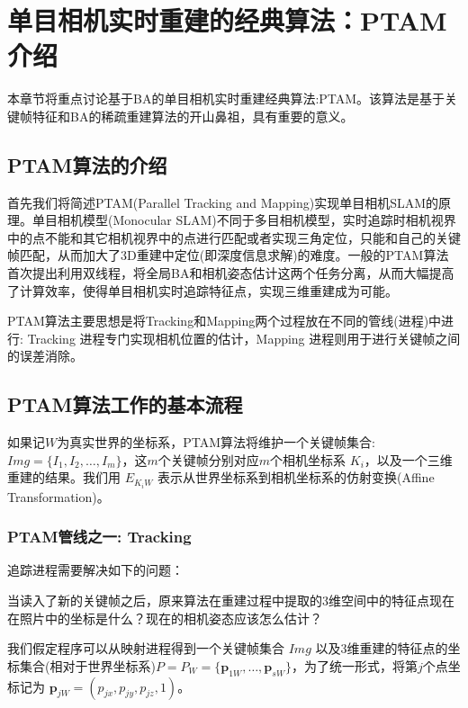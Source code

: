 
\def \R2{\mathbb{R}^2}
\def \R3{\mathbb{R}^3}
\def \Rn{\mathbb{R}^n}

\def \itW{\mathit{W}}

\def \itK{\mathit{K}}
\def \bfp{\mathbf{p}}

\chapter{单目相机实时重建的经典算法：PTAM介绍}

本章节将重点讨论基于BA的单目相机实时重建经典算法:PTAM。该算法是基于关键帧特征和BA的稀疏重建算法的开山鼻祖，具有重要的意义。

\section{PTAM算法的介绍}
首先我们将简述PTAM\cite{Klein2007}(Parallel Tracking and Mapping)实现单目相机SLAM的原理。单目相机模型(Monocular SLAM)不同于多目相机模型，实时追踪时相机视界中的点不能和其它相机视界中的点进行匹配或者实现三角定位，只能和自己的关键帧匹配，从而加大了3D重建中定位(即深度信息求解)的难度。一般的PTAM算法首次提出利用双线程，将全局BA和相机姿态估计这两个任务分离，从而大幅提高了计算效率，使得单目相机实时追踪特征点，实现三维重建成为可能。

PTAM算法主要思想是将Tracking和Mapping两个过程放在不同的管线(进程)中进行: Tracking 进程专门实现相机位置的估计，Mapping 进程则用于进行关键帧之间的误差消除。

\section{PTAM算法工作的基本流程}
如果记$\itW$为真实世界的坐标系，PTAM算法将维护一个关键帧集合: $Img=\{I_1,I_2,\ldots,I_m\}$，这\(m\)个关键帧分别对应\(m\)个相机坐标系 $\itK_i$，以及一个三维重建的结果。我们用 $E_{\itK_i\itW}$ 表示从世界坐标系到相机坐标系的仿射变换(Affine Transformation)。


\subsection{PTAM管线之一: Tracking}


追踪进程需要解决如下的问题：

当读入了新的关键帧之后，原来算法在重建过程中提取的3维空间中的特征点现在在照片中的坐标是什么？现在的相机姿态应该怎么估计？ 

我们假定程序可以从映射进程得到一个关键帧集合 $Img$ 以及3维重建的特征点的坐标集合(相对于世界坐标系)$P=P_\itW=\{\bfp_{1\itW},\ldots,\bfp_{s\itW}\}$，为了统一形式，将第$j$个点坐标记为 $\bfp_{j\itW}= (p_{jx},p_{jy},p_{jz},1)$。

